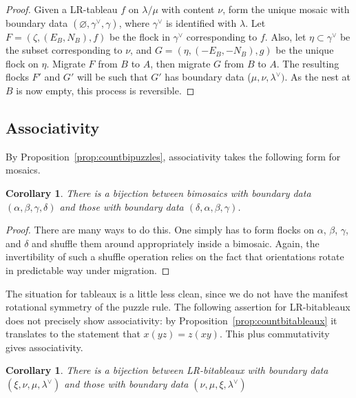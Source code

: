 \documentclass[12pt]{article}
\newtheorem{corollary}[lemma]{Corollary}
\begin{document}
\begin{proof}
Given a LR-tableau $f$ on $\lambda/\mu$ with content $\nu$,
form the unique mosaic with boundary data $(\varnothing, \gamma^\vee, \gamma)$,
where $\gamma^\vee$ is identified with $\lambda$.  Let
$F = (\zeta, (E_B, N_B), f)$ be the flock in $\gamma^\vee$ corresponding
to $f$.  Also, let $\eta \subset \gamma^\vee$ be the subset corresponding
to $\nu$, and $G = (\eta, (-E_B, -N_B), g)$ be the unique flock on $\eta$.
Migrate $F$ from $B$ to $A$, then migrate $G$ from $B$ to $A$.
The resulting flocks $F'$ and $G'$ will be such that
$G'$ has boundary data ($\mu, \nu, \lambda^\vee)$.  As the nest
at $B$ is now empty, this process is reversible.
\end{proof}

\subsection{Associativity}

By Proposition~\ref{prop:countbipuzzles},
associativity takes the following form for mosaics.
\begin{corollary}
There is a bijection between bimosaics with boundary data
$(\alpha, \beta, \gamma, \delta)$ and those
with boundary data
$(\delta, \alpha, \beta, \gamma)$.
\end{corollary}

\begin{proof}
There are many ways to do this.  One simply has to form flocks
on $\alpha$, $\beta$, $\gamma$, and $\delta$ and shuffle them
around appropriately inside a bimosaic.   Again, the invertibility 
of such a shuffle operation relies on the fact that orientations rotate in 
predictable way under migration.
\end{proof}

The situation for tableaux is a little less clean, since we
do not have the manifest rotational symmetry of the puzzle rule.
The following assertion for LR-bitableaux does not precisely
show associativity: by Proposition~\ref{prop:countbitableaux}
it translates to the statement that
$x(yz) = z(xy)$.  This plus commutativity gives associativity.

\begin{corollary}
\label{cor:tableauassociate}
There is a bijection between LR-bitableaux with boundary
data $(\xi, \nu, \mu, \lambda^\vee)$ and those with boundary data
$(\nu, \mu, \xi, \lambda^\vee)$
\end{corollary}
\end{document}
